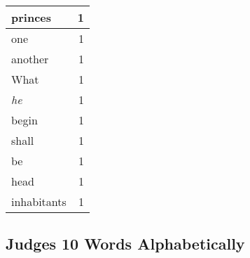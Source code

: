 \begin{center}
\begin{longtable}{l|r}
princes & 1\\ \hline 
one & 1\\ \hline 
another & 1\\ \hline 
What & 1\\ \hline 
\emph{he} & 1\\ \hline 
begin & 1\\ \hline 
shall & 1\\ \hline 
be & 1\\ \hline 
head & 1\\ \hline 
inhabitants & 1\\ \hline 
\end{longtable}
\end{center}





\subsection{Judges 10 Words Alphabetically}


\normalsize
 
